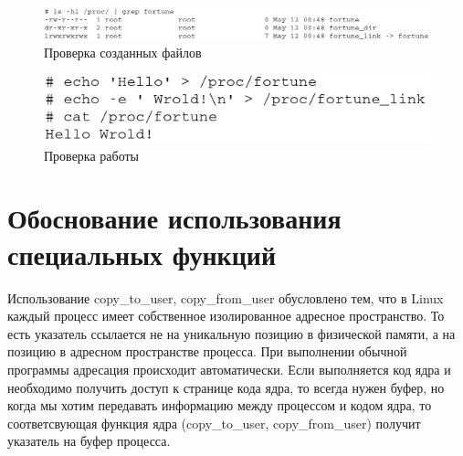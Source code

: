 \begin{figure}[H]
    \includegraphics[scale=0.4]{images/procfiles.png}
    \caption{Проверка созданных файлов}\label{img:procfiles}
\end{figure}

\begin{figure}[H]
    \includegraphics[scale=0.4]{images/showcase.png}
    \caption{Проверка работы}\label{img:showcase}
\end{figure}

\section{Обоснование использования\\специальных функций}
Использование copy\_to\_user, copy\_from\_user обусловлено тем, что в Linux каждый процесс имеет собственное изолированное адресное пространство. То есть указатель ссылается не на уникальную позицию в  физической памяти, а на позицию в адресном пространстве процесса. При выполнении обычной программы адресация происходит автоматически. Если выполняется код ядра и необходимо получить доступ к странице кода ядра, то всегда нужен буфер, но когда мы хотим передавать информацию между процессом и кодом ядра, то соответсвующая функция ядра (copy\_to\_user, copy\_from\_user) получит указатель на буфер процесса.

